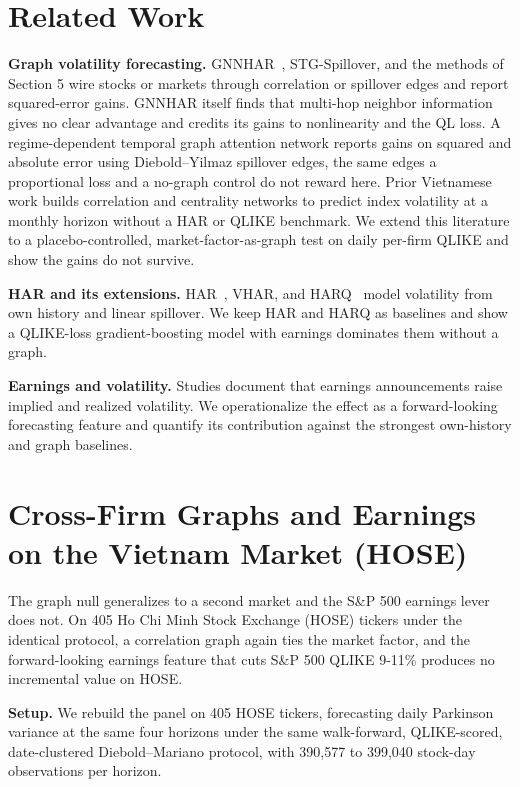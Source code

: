 \documentclass{llncs}
\begin{document}
\section{Related Work}
\textbf{Graph volatility forecasting.} GNNHAR~\cite{gnnhar}, STG-Spillover, and the methods of Section 5 wire stocks or markets
through correlation or spillover edges and report squared-error gains. GNNHAR itself finds that multi-hop
neighbor information gives no clear advantage and credits its gains to nonlinearity and the QL loss. A
regime-dependent temporal graph attention network reports gains on squared and absolute error using
Diebold--Yilmaz spillover edges, the same edges a proportional loss and a no-graph control do not reward here.
Prior Vietnamese work builds correlation and centrality networks to predict index volatility at a monthly horizon
without a HAR or QLIKE benchmark. We extend this literature to a placebo-controlled, market-factor-as-graph test
on daily per-firm QLIKE and show the gains do not survive.

\textbf{HAR and its extensions.} HAR~\cite{corsi2009}, VHAR, and HARQ~\cite{harq2016} model volatility from own history and linear spillover. We keep
HAR and HARQ as baselines and show a QLIKE-loss gradient-boosting model with earnings dominates them without a
graph.

\textbf{Earnings and volatility.} Studies document that earnings announcements raise implied and realized volatility.
We operationalize the effect as a forward-looking forecasting feature and quantify its contribution against the
strongest own-history and graph baselines.

\FloatBarrier
\section{Cross-Firm Graphs and Earnings on the Vietnam Market (HOSE)}
The graph null generalizes to a second market and the S\&P 500 earnings lever does not. On 405 Ho Chi Minh Stock
Exchange (HOSE) tickers under the identical protocol, a correlation graph again ties the market factor, and the
forward-looking earnings feature that cuts S\&P 500 QLIKE 9-11\% produces no incremental value on HOSE.

\textbf{Setup.} We rebuild the panel on 405 HOSE tickers, forecasting daily Parkinson variance at the same four
horizons under the same walk-forward, QLIKE-scored, date-clustered Diebold--Mariano protocol, with 390,577 to
399,040 stock-day observations per horizon.
\end{document}
